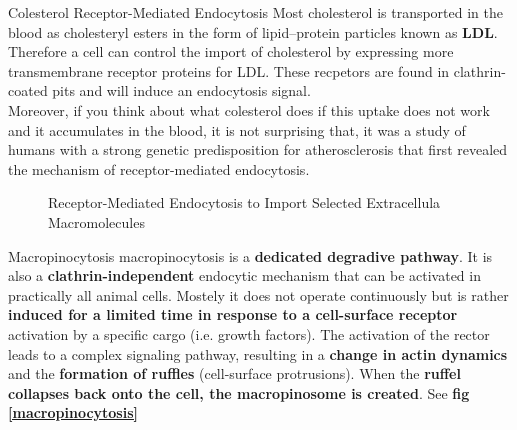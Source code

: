 \documentclass[../main.tex]{subfiles}
\begin{document}
\begin{ExWithTitle}{Colesterol Receptor-Mediated Endocytosis}
	Most cholesterol is transported in the blood as cholesteryl esters in the form of 
	lipid–protein particles known as \textbf{\gls{LDL}}. Therefore a cell can control the import of cholesterol by expressing more transmembrane receptor proteins for LDL. These recpetors are found in clathrin-coated pits and will induce an endocytosis signal.\\
	\indent Moreover, if you think about what colesterol does if this uptake does not work and it accumulates in the blood, it is not surprising that, it was a study of humans with a strong genetic predisposition for atherosclerosis that first revealed the mechanism of receptor-mediated endocytosis.
\end{ExWithTitle}

\begin{figure}[H]
	\centering
	\caption{Receptor-Mediated Endocytosis to Import Selected Extracellula Macromolecules}
\end{figure}

\begin{RemarkWithTitel}{Macropinocytosis}
	\gls{macropinocytosis} is a \textbf{dedicated degradive pathway}. It is also a \textbf{clathrin-independent} endocytic mechanism that can be activated in practically all animal cells. Mostely it does not operate continuously but is rather \textbf{induced for a limited time in response to a cell-surface receptor} activation by a specific cargo (i.e. growth factors). The activation of the rector leads to a complex signaling pathway, resulting in a \textbf{change in actin dynamics} and the \textbf{formation of ruffles} (cell-surface protrusions). When the \textbf{ruffel collapses back onto the cell, the macropinosome is created}. See\textbf{ fig \ref{macropinocytosis}}
\end{RemarkWithTitel}
\end{document}
